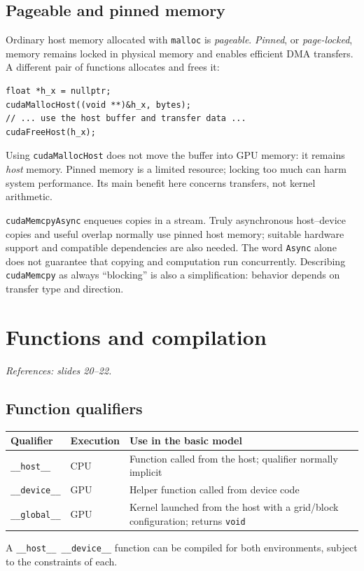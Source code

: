 \documentclass[11pt,a4paper]{article}
\let\originalsection\section
\renewcommand{\section}{\Needspace{7\baselineskip}\originalsection}
\let\originalsubsection\subsection
\renewcommand{\subsection}{\Needspace{5\baselineskip}\originalsubsection}
\newcommand{\src}[1]{\par{\small\color{accent}\textit{References: #1.}}\par}
\begin{document}
\subsection{Pageable and pinned memory}
Ordinary host memory allocated with \texttt{malloc} is \emph{pageable}.
\emph{Pinned}, or \emph{page-locked}, memory remains locked in physical
memory and enables efficient DMA transfers. A different pair of functions
allocates and frees it:
\begin{lstlisting}
float *h_x = nullptr;
cudaMallocHost((void **)&h_x, bytes);
// ... use the host buffer and transfer data ...
cudaFreeHost(h_x);
\end{lstlisting}
Using \texttt{cudaMallocHost} does not move the buffer into GPU memory:
it remains \emph{host} memory. Pinned memory is a limited resource;
locking too much can harm system performance. Its main benefit here
concerns transfers, not kernel arithmetic.

\texttt{cudaMemcpyAsync} enqueues copies in a stream. Truly asynchronous
host--device copies and useful overlap normally use pinned host memory;
suitable hardware support and compatible dependencies are also needed.
The word \texttt{Async} alone does not guarantee that copying and computation
run concurrently. Describing \texttt{cudaMemcpy} as always ``blocking''
is also a simplification: behavior depends on transfer type and direction.

\section{Functions and compilation}
\src{slides 20--22}
\subsection{Function qualifiers}
\begin{center}
\begin{tabularx}{\linewidth}{@{}lXX@{}}\toprule
Qualifier & Execution & Use in the basic model \\\midrule
\texttt{\_\_host\_\_} & CPU & Function called from the host; qualifier normally implicit \\
\texttt{\_\_device\_\_} & GPU & Helper function called from device code \\
\texttt{\_\_global\_\_} & GPU & Kernel launched from the host with a grid/block configuration; returns \texttt{void} \\\bottomrule
\end{tabularx}
\end{center}
A \texttt{\_\_host\_\_ \_\_device\_\_} function can be compiled for both
environments, subject to the constraints of each.
\end{document}
